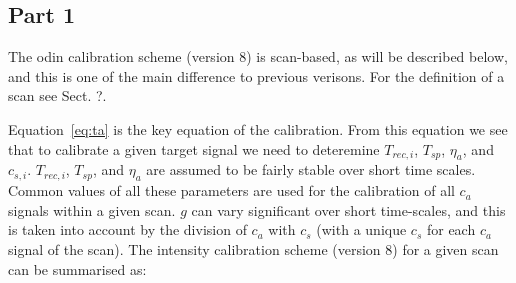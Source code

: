\subsection*{Part 1}

The odin calibration scheme (version 8) is scan-based, as will be described below, and
this is one of the main difference to previous verisons. For the definition of a scan see
Sect. ?.

Equation~\ref{eq:ta} is the key equation of the calibration.
From this equation we see that to calibrate a given target signal
we need to deteremine \(T_{rec,i}\), \(T_{sp}\), \(\eta_{a}\),
and \(c_{s,i}\). \(T_{rec,i}\), \(T_{sp}\), and \(\eta_{a}\)
are assumed to be fairly stable over short time scales.
Common values of all these parameters are used for
the calibration of all \(c_{a}\) signals within a given scan.
\(g\) can vary significant over short time-scales,
and this is taken into account by the division of \(c_{a}\) with
\(c_{s}\) (with a unique \(c_{s}\) for each \(c_{a}\)
signal of the scan). The intensity calibration scheme (version 8)
for a given scan can be summarised as:
